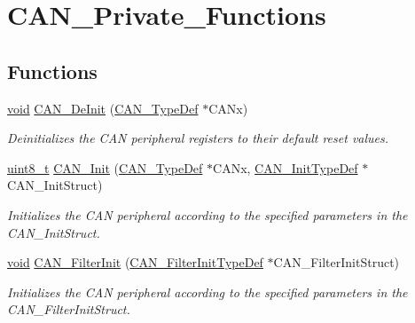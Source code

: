 \hypertarget{group___c_a_n___private___functions}{}\section{C\+A\+N\+\_\+\+Private\+\_\+\+Functions}
\label{group___c_a_n___private___functions}
\subsection*{Functions}
\begin{DoxyCompactItemize}
\item 
\hyperlink{usb__devapi_8h_afabf60e7f57651d6d595a02c75f07cd0}{void} \hyperlink{group___c_a_n___private___functions_ga002b74cd69574a14b17ad445090245cd}{C\+A\+N\+\_\+\+De\+Init} (\hyperlink{struct_c_a_n___type_def}{C\+A\+N\+\_\+\+Type\+Def} $\ast$C\+A\+Nx)
\begin{DoxyCompactList}\small\item\em Deinitializes the C\+AN peripheral registers to their default reset values. \end{DoxyCompactList}\item 
\hyperlink{_p_e___types_8h_aba7bc1797add20fe3efdf37ced1182c5}{uint8\+\_\+t} \hyperlink{group___c_a_n___private___functions_ga9023c35a9ab931ad4513fc5d19b4bd6c}{C\+A\+N\+\_\+\+Init} (\hyperlink{struct_c_a_n___type_def}{C\+A\+N\+\_\+\+Type\+Def} $\ast$C\+A\+Nx, \hyperlink{struct_c_a_n___init_type_def}{C\+A\+N\+\_\+\+Init\+Type\+Def} $\ast$C\+A\+N\+\_\+\+Init\+Struct)
\begin{DoxyCompactList}\small\item\em Initializes the C\+AN peripheral according to the specified parameters in the C\+A\+N\+\_\+\+Init\+Struct. \end{DoxyCompactList}\item 
\hyperlink{usb__devapi_8h_afabf60e7f57651d6d595a02c75f07cd0}{void} \hyperlink{group___c_a_n___private___functions_ga39476830280340363c51041be6b12647}{C\+A\+N\+\_\+\+Filter\+Init} (\hyperlink{struct_c_a_n___filter_init_type_def}{C\+A\+N\+\_\+\+Filter\+Init\+Type\+Def} $\ast$C\+A\+N\+\_\+\+Filter\+Init\+Struct)
\begin{DoxyCompactList}\small\item\em Initializes the C\+AN peripheral according to the specified parameters in the C\+A\+N\+\_\+\+Filter\+Init\+Struct. \end{DoxyCompactList}\item 

\end{DoxyCompactItemize}
